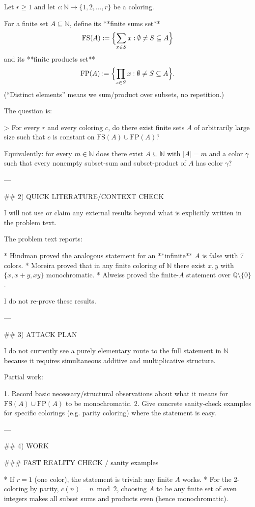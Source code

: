 Let $r\ge 1$ and let $c:\mathbb N\to\{1,2,\dots,r\}$ be a coloring.

For a finite set $A\subseteq\mathbb N$, define its **finite sums set**
\[
\mathrm{FS}(A):=\Bigl\{\sum_{x\in S} x: \emptyset\ne S\subseteq A\Bigr\}
\]
and its **finite products set**
\[
\mathrm{FP}(A):=\Bigl\{\prod_{x\in S} x: \emptyset\ne S\subseteq A\Bigr\}.
\]
(“Distinct elements” means we sum/product over subsets, no repetition.)

The question is:

> For every $r$ and every coloring $c$, do there exist finite sets $A$ of arbitrarily large size such that $c$ is constant on $\mathrm{FS}(A)\cup \mathrm{FP}(A)$?

Equivalently: for every $m\in\mathbb N$ does there exist $A\subseteq\mathbb N$ with $|A|=m$ and a color $\gamma$ such that every nonempty subset-sum and subset-product of $A$ has color $\gamma$?

---

## 2) QUICK LITERATURE/CONTEXT CHECK

I will not use or claim any external results beyond what is explicitly written in the problem text.

The problem text reports:

* Hindman proved the analogous statement for an **infinite** $A$ is false with 7 colors.
* Moreira proved that in any finite coloring of $\mathbb N$ there exist $x,y$ with $\{x,x+y,xy\}$ monochromatic.
* Alweiss proved the finite-$A$ statement over $\mathbb Q\setminus\{0\}$.

I do not re-prove these results.

---

## 3) ATTACK PLAN

I do not currently see a purely elementary route to the full statement in $\mathbb N$ because it requires simultaneous additive and multiplicative structure.

Partial work:

1. Record basic necessary/structural observations about what it means for $\mathrm{FS}(A)\cup\mathrm{FP}(A)$ to be monochromatic.
2. Give concrete sanity-check examples for specific colorings (e.g. parity coloring) where the statement is easy.

---

## 4) WORK

### FAST REALITY CHECK / sanity examples

* If $r=1$ (one color), the statement is trivial: any finite $A$ works.
* For the 2-coloring by parity, $c(n)=n\bmod 2$, choosing $A$ to be any finite set of even integers makes all subset sums and products even (hence monochromatic).

